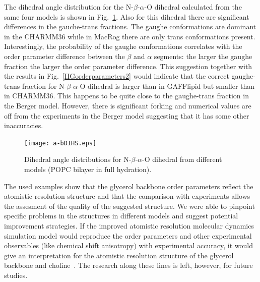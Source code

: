 \documentclass[pre,aps,floatfix,authordate1-4,twocolumn]{revtex4-1}
\begin{document}
The dihedral angle distribution for the  N-$\beta$-$\alpha$-O dihedral calculated from the same four models is 
shown in Fig.~\ref{dihDISTS2}. Also for this dihedral there are significant differences in the gauche-trans fractions.
The gaughe conformations are dominant in the CHARMM36 while in MacRog there are only trans conformations present.
Interestingly, the probability of the gaughe conformations correlates with the order parameter difference between the $\beta$ and $\alpha$ segments:
the larger the gaughe fraction the larger the order parameter difference. This suggestion together with the results in 
Fig.~\ref{HGorderparameters2} would indicate that the correct gaughe-trans fraction for N-$\beta$-$\alpha$-O dihedral is 
larger than in GAFFlipid but smaller than in CHARMM36. This happens to be quite close to the gaughe-trans fraction in
the Berger model. However, there is significant forking and numerical values are off from the experiments in the Berger
model suggesting that it has some other inaccuracies.
\begin{figure}[]
  \centering
  \texttt{[image: a-bDIHS.eps]}
  \caption{\label{dihDISTS2}
    Dihedral angle distributions for N-$\beta$-$\alpha$-O dihedral from different models (POPC bilayer in full hydration).
  } 
\end{figure}

The used examples show that the glycerol backbone order parameters reflect the atomistic resolution structure
and that the comparison with experiments allows the assesment of the quality of the suggested structure. We were able to pinpoint
specific problems in the structures in different models and suggest potential improvement strategies.
If the improved atomistic resolution
molecular dynamics simulation model would reproduce the order parameters and other experimental observables (like chemical shift anisotropy)
with experimental accuracy, it would give an interpretation for the atomistic resolution structure of the glycerol backbone and 
choline~\cite{seelig77b,skarjune79,jacobs80,davis83,akutsu91,hong95b,semchyschyn04}. The research along these lines is left, however,
for future studies.
\end{document}
